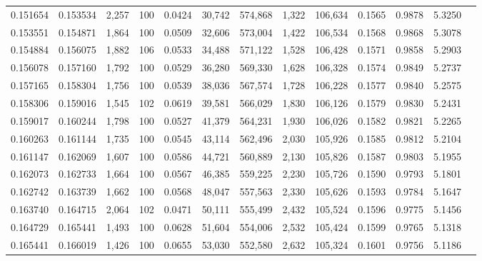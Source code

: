 \begin{tabular}{rrrrrrrrrrrrr}
0.151654 & 0.153534 & 2,257 & 100 &                                     0.0424 &  30,742 & 574,868 &   1,322 & 106,634 & 0.1565 & 0.9878 & 5.3250 \\
0.153551 & 0.154871 & 1,864 & 100 &                                     0.0509 &  32,606 & 573,004 &   1,422 & 106,534 & 0.1568 & 0.9868 & 5.3078 \\
0.154884 & 0.156075 & 1,882 & 106 &                                     0.0533 &  34,488 & 571,122 &   1,528 & 106,428 & 0.1571 & 0.9858 & 5.2903 \\
0.156078 & 0.157160 & 1,792 & 100 &                                     0.0529 &  36,280 & 569,330 &   1,628 & 106,328 & 0.1574 & 0.9849 & 5.2737 \\
0.157165 & 0.158304 & 1,756 & 100 &                                     0.0539 &  38,036 & 567,574 &   1,728 & 106,228 & 0.1577 & 0.9840 & 5.2575 \\
0.158306 & 0.159016 & 1,545 & 102 &                                     0.0619 &  39,581 & 566,029 &   1,830 & 106,126 & 0.1579 & 0.9830 & 5.2431 \\
0.159017 & 0.160244 & 1,798 & 100 &                                     0.0527 &  41,379 & 564,231 &   1,930 & 106,026 & 0.1582 & 0.9821 & 5.2265 \\
0.160263 & 0.161144 & 1,735 & 100 &                                     0.0545 &  43,114 & 562,496 &   2,030 & 105,926 & 0.1585 & 0.9812 & 5.2104 \\
0.161147 & 0.162069 & 1,607 & 100 &                                     0.0586 &  44,721 & 560,889 &   2,130 & 105,826 & 0.1587 & 0.9803 & 5.1955 \\
0.162073 & 0.162733 & 1,664 & 100 &                                     0.0567 &  46,385 & 559,225 &   2,230 & 105,726 & 0.1590 & 0.9793 & 5.1801 \\
0.162742 & 0.163739 & 1,662 & 100 &                                     0.0568 &  48,047 & 557,563 &   2,330 & 105,626 & 0.1593 & 0.9784 & 5.1647 \\
0.163740 & 0.164715 & 2,064 & 102 &                                     0.0471 &  50,111 & 555,499 &   2,432 & 105,524 & 0.1596 & 0.9775 & 5.1456 \\
0.164729 & 0.165441 & 1,493 & 100 &                                     0.0628 &  51,604 & 554,006 &   2,532 & 105,424 & 0.1599 & 0.9765 & 5.1318 \\
0.165441 & 0.166019 & 1,426 & 100 &                                     0.0655 &  53,030 & 552,580 &   2,632 & 105,324 & 0.1601 & 0.9756 & 5.1186 \\

\end{tabular}
